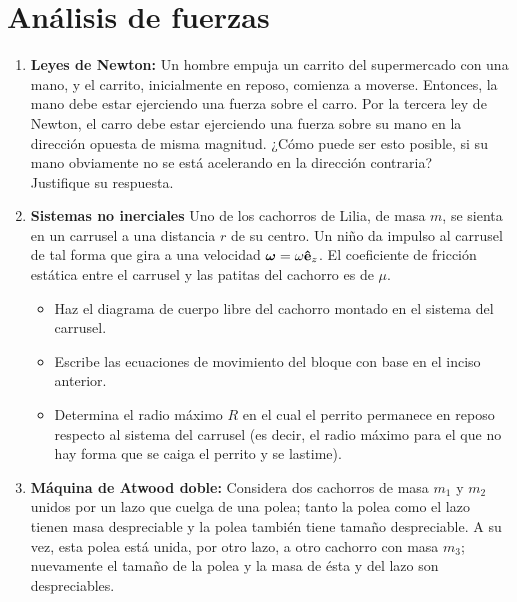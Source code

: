 \documentclass[12pt]{article}
\title{
    \textbf{\homeworknumber: \subject}\\
    \normalsize\vspace{0.1in}\small{\textbf{Entrega}:~\today}
    \vspace{-1.25in}
}
\author{}
\date{}
\theoremstyle{problem}
\DeclareRobustCommand{\uvec}[1]{{%
  \ifcsname uvec#1\endcsname
     \csname uvec#1\endcsname
   \else
    \bm{\hat{\mathbf{#1}}}%
   \fi
}}%
\begin{document}
    \maketitle
    \thispagestyle{fancy}
    
    \section*{Análisis de fuerzas}
\begin{enumerate}[label=\textbf{1.\arabic*)}]
    \item \textbf{Leyes de Newton:}
    Un hombre empuja un carrito del supermercado con una mano, y el carrito, inicialmente en reposo, comienza a moverse. Entonces, la mano debe estar ejerciendo una fuerza sobre el carro. Por la tercera ley de Newton, el carro debe estar ejerciendo una fuerza sobre su mano en la dirección opuesta de misma magnitud. ¿Cómo puede ser esto posible, si su mano obviamente no se está acelerando en la dirección contraria? \\
    Justifique su respuesta.
    \item \textbf{Sistemas no inerciales}
    Uno de los cachorros de Lilia, de masa \(m\), se sienta en un carrusel a una distancia \(r\) de su centro. Un niño da impulso al carrusel de tal forma que gira a una velocidad \(\bm{\omega}=\omega\uvec{e}_{z}\). El coeficiente de fricción estática entre el carrusel y las patitas del cachorro es de \(\mu\).
\begin{itemize}[label = \textbullet]
    \item Haz el diagrama de cuerpo libre del cachorro montado en el sistema del carrusel.
    \item Escribe las ecuaciones de movimiento del bloque con base en el inciso anterior.
    \item Determina el radio máximo \(R\) en el cual el perrito permanece en reposo respecto al sistema del carrusel (es decir, el radio máximo para el que no hay forma que se caiga el perrito y se lastime).
\end{itemize}
    \item \textbf{Máquina de Atwood doble:}
    Considera dos cachorros de masa \(m_{1}\) y \(m_{2}\) unidos por un lazo que cuelga de una polea; tanto la polea como el lazo tienen masa despreciable y la polea también tiene tamaño despreciable. A su vez, esta polea está unida, por otro lazo, a otro cachorro con masa \(m_{3}\); nuevamente el tamaño de la polea y la masa de ésta y del lazo son despreciables.
    \begin{itemize}[label = \textbullet]

\end{itemize}
\end{enumerate}
\end{document}
